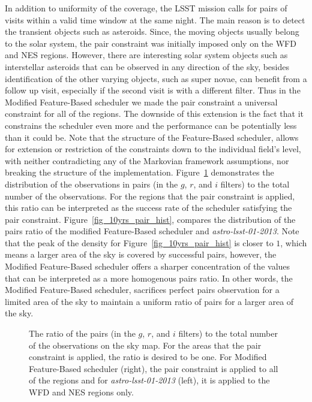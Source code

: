 \documentclass[12pt]{aastex62}
\theoremstyle{definition}
\begin{document}
In addition to uniformity of the coverage, the LSST mission calls for pairs of visits within a valid time window at the same night. The main reason is to detect the transient objects such as asteroids. Since, the moving objects usually belong to the solar system, the pair constraint was initially imposed only on the WFD and NES regions. However, there are interesting solar system objects such as interstellar asteroids that can be observed in any direction of the sky, besides identification of the other varying objects, such as super novae, can benefit from a follow up visit, especially if the second visit is with a different filter. Thus in the Modified Feature-Based scheduler we made the pair constraint a universal constraint for all of the regions. The downside of this extension is the fact that it constrains the scheduler even more and the performance can be potentially less than it could be. Note that the structure of the Feature-Based scheduler, allows for extension or restriction of the constraints down to the individual field's level, with neither contradicting any of the Markovian framework assumptions, nor breaking the structure of the implementation. Figure~\ref{fig_10yrs_pair} demonstrates the distribution of the observations in pairs (in the $g$, $r$, and $i$ filters) to the total number of the observations. For the regions that the pair constraint is applied, this ratio can be interpreted as the success rate of the scheduler satisfying the pair constraint. Figure~\ref{fig_10yrs_pair_hist}, compares the distribution of the pairs ratio of the modified Feature-Based scheduler and \textit{astro-lsst-01-2013}. Note that the peak of the density for Figure~\ref{fig_10yrs_pair_hist} is closer to $1$, which means a larger area of the sky is covered by successful pairs, however, the Modified Feature-Based scheduler offers a sharper concentration of the values that can be interpreted as a more homogenous pairs ratio. In other words, the Modified Feature-Based scheduler, sacrifices perfect pairs observation for a limited area of the sky to maintain a uniform ratio of pairs for a larger area of the sky.

\begin{figure}[h!]
\caption{The ratio of the pairs (in the $g$, $r$, and $i$ filters) to the total number of the observations on the sky map. For the areas that the pair constraint is applied, the ratio is desired to be one. For Modified Feature-Based scheduler (right), the pair constraint is applied to all of the regions and for \textit{astro-lsst-01-2013} (left), it is applied to the WFD and NES regions only.}
\label{fig_10yrs_pair}
\end{figure}
\end{document}
